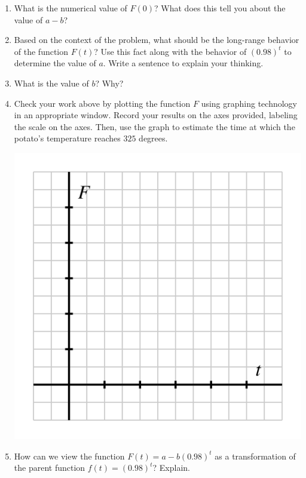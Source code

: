 \documentclass[nooutcomes]{ximera}
\begin{document}
\begin{exploration}
\begin{enumerate}[label=\alph*.]
\item What is the numerical value of $F(0)$? What does this tell you about the value of $a - b$?
\item Based on the context of the problem, what should be the long-range behavior of the function $F(t)$? Use this fact along with the behavior of $(0.98)^t$ to determine the value of $a$.  Write a sentence to explain your thinking.
\item What is the value of $b$?  Why?%
\item Check your work above by plotting the function $F$ using graphing technology in an appropriate window. Record your results on the axes provided, labeling the scale on the axes. Then, use the graph to estimate the time at which the potato's temperature reaches $325$ degrees.
\begin{image}
\includegraphics{modeling-F-t-blank-axes.jpg}
\end{image}
\item How can we view the function $F(t) = a - b(0.98)^t$ as a transformation of the parent function $f(t) = (0.98)^t$?  Explain.
\end{enumerate}
\end{exploration}
\end{document}
